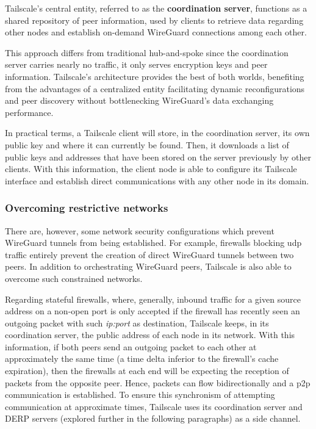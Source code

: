 \documentclass[11pt,twoside,a4paper]{report}
\begin{document}
Tailscale's central entity, referred to as the \textbf{coordination server}, functions as a shared repository of peer information, used by clients to retrieve data regarding other nodes and establish on-demand WireGuard connections among each other.

This approach differs from traditional hub-and-spoke since the coordination server carries nearly no traffic, it only serves encryption keys and peer information. Tailscale's architecture provides the best of both worlds, benefiting from the advantages of a centralized entity facilitating dynamic reconfigurations and peer discovery without bottlenecking WireGuard's data exchanging performance.

In practical terms, a Tailscale client will store, in the coordination server, its own public key and where it can currently be found. Then, it downloads a list of public keys and addresses that have been stored on the server previously by other clients. With this information, the client node is able to configure its Tailscale interface and establish direct communications with any other node in its domain.

\subsubsection{Overcoming restrictive networks}
\label{ssec:tsnetworks}

There are, however, some network security configurations which prevent WireGuard tunnels from being established. For example, firewalls blocking \ac{udp} traffic entirely prevent the creation of direct WireGuard tunnels between two peers. In addition to orchestrating WireGuard peers, Tailscale is also able to overcome such constrained networks.

Regarding stateful firewalls, where, generally, inbound traffic for a given source address on a non-open port is only accepted if the firewall has recently seen an outgoing packet with such \emph{ip:port} as destination, Tailscale keeps, in its coordination server, the public address of each node in its network. With this information, if both peers send an outgoing packet to each other at approximately the same time (a time delta inferior to the firewall's cache expiration), then the firewalls at each end will be expecting the reception of packets from the opposite peer. Hence, packets can flow bidirectionally and a \ac{p2p} communication is established. To ensure this synchronism of attempting communication at approximate times, Tailscale uses its coordination server and \ac{DERP} servers (explored further in the following paragraphs) as a side channel.
\end{document}
